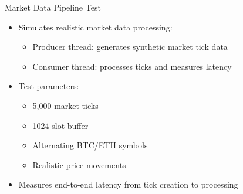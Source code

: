 \documentclass{beamer}
\begin{document}
\begin{frame}{Market Data Pipeline Test}
\begin{itemize}
    \item Simulates realistic market data processing:
    \begin{itemize}
        \item Producer thread: generates synthetic market tick data
        \item Consumer thread: processes ticks and measures latency
    \end{itemize}
    \item Test parameters:
    \begin{itemize}
        \item 5,000 market ticks
        \item 1024-slot buffer
        \item Alternating BTC/ETH symbols
        \item Realistic price movements
    \end{itemize}
    \item Measures end-to-end latency from tick creation to processing
\end{itemize}
\end{frame}
\end{document}
